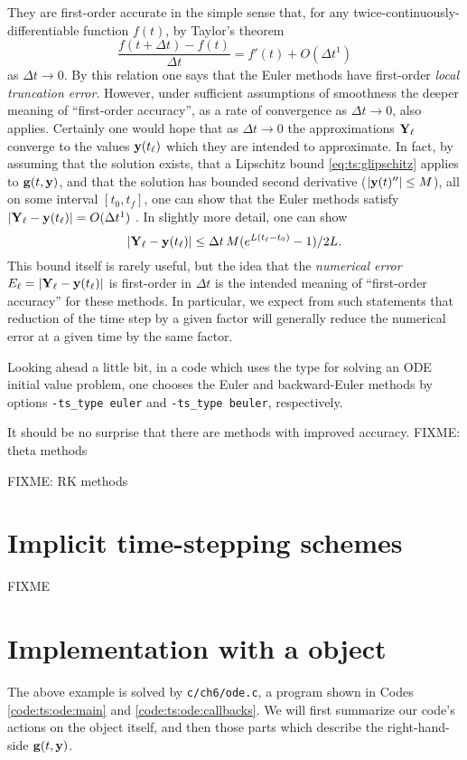 They are first-order accurate in the simple sense that, for any twice-continuously-differentiable function $f(t)$, by Taylor's theorem
    $$\frac{f(t+\Delta t) - f(t)}{\Delta t} = f'(t) + O(\Delta t^1)$$
as $\Delta t \to 0$.  By this relation one says that the Euler methods have first-order \emph{local truncation error}.  However, under sufficient assumptions of smoothness the deeper meaning of ``first-order accuracy'', as a rate of convergence as $\Delta t\to 0$, also applies.  Certainly one would hope that as $\Delta t \to 0$ the approximations $\mathbf{Y}_\ell$ converge to the values $\mathbf{y}(t_\ell)$ which they are intended to approximate.  In fact, by assuming that the solution exists, that a Lipschitz bound \eqref{eq:ts:glipschitz} applies to $\mathbf{g}(t,\mathbf{y})$, and that the solution has bounded second derivative ($|\mathbf{y}(t)''|\le M$), all on some interval $[t_0,t_f]$, one can show that the Euler methods satisfy $|\mathbf{Y}_\ell-\mathbf{y}(t_\ell)| = O(\Delta t^1)$ \citep{AscherPetzold1998}.  In slightly more detail, one can show
    $$|\mathbf{Y}_\ell-\mathbf{y}(t_\ell)| \le \Delta t\,M (e^{L(t_\ell-t_0)}-1) / 2 L.$$
This bound itself is rarely useful, but the idea that the \emph{numerical error} $E_\ell = |\mathbf{Y}_\ell-\mathbf{y}(t_\ell)|$ is first-order in $\Delta t$ is the intended meaning of ``first-order accuracy'' for these methods.  In particular, we expect from such statements that reduction of the time step by a given factor will generally reduce the numerical error at a given time by the same factor.

Looking ahead a little bit, in a \PETSc code which uses the \pTS type for solving an ODE initial value problem, one chooses the Euler and backward-Euler methods by options \texttt{-ts\_type euler} and \texttt{-ts\_type beuler}, respectively.

It should be no surprise that there are methods with improved accuracy.  FIXME: theta methods

FIXME: RK methods


\section{Implicit time-stepping schemes}  FIXME


\section{Implementation with a \PETSc \pTS object}

The above example is solved by \texttt{c/ch6/ode.c}, a program shown in Codes \ref{code:ts:ode:main} and \ref{code:ts:ode:callbacks}.  We will first summarize our code's actions on the \pTS object itself, and then those parts which describe the right-hand-side $\mathbf{g}(t,\mathbf{y})$.

